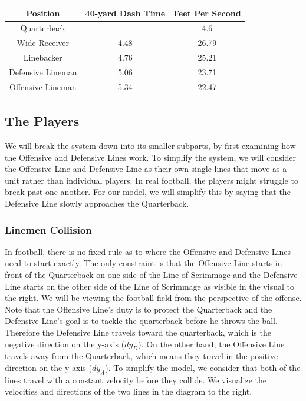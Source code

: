 \begin{center}
\begin{tabular}{ |c|c|c| } 
 \hline
 \textbf{Position}\footnotemark & \textbf{40-yard Dash Time} & \textbf{Feet Per Second} \\ 
 \hline
 Quarterback & -- & 4.6 \\ 
 Wide Receiver & 4.48 & 26.79 \\ 
 Linebacker & 4.76 & 25.21 \\ 
 Defensive Lineman & 5.06 & 23.71 \\ 
 Offensive Lineman & 5.34 & 22.47 \\ 
 \hline
\end{tabular}
\end{center}


\subsection{The Players}

\quad We will break the system down into its smaller subparts, by first examining how the Offensive and Defensive Lines work. To simplify the system, we will consider the Offensive Line and Defensive Line as their own single lines that move as a unit rather than individual players. In real football, the players might struggle to break past one another. For our model, we will simplify this by saying that the Defensive Line slowly approaches the Quarterback.

\subsubsection{Linemen Collision}
\quad  In football, there is no fixed rule as to where the Offensive and Defensive Lines need to start exactly. The only constraint is that the Offensive Line starts in front of the Quarterback on one side of the Line of Scrimmage and the Defensive Line starts on the other side of the Line of Scrimmage as visible in the visual to the right. We will be viewing the football field from the perspective of the offense. \\

Note that the Offensive Line’s duty is to protect the Quarterback and the Defensive Line’s goal is to tackle the quarterback before he throws the ball. Therefore the Defensive Line travels toward the quarterback, which is the negative direction on the y-axis ($dy_D$). On the other hand, the Offensive Line travels away from the Quarterback, which means they travel in the positive direction on the y-axis ($dy_A$). To simplify the model, we consider that both of the lines travel with a constant velocity before they collide. We visualize the velocities and directions of the two lines in the diagram to the right. \\

